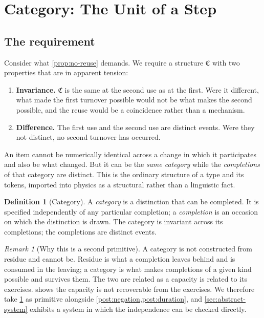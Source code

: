 \documentclass[11pt,twocolumn,a4paper]{article}
\theoremstyle{plain}
\theoremstyle{definition}
\newtheorem{definition}[theorem]{Definition}
\theoremstyle{remark}
\newtheorem{remark}[theorem]{Remark}
\newcommand{\Cat}{\mathfrak{C}}
\begin{document}
\section{Category: The Unit of a Step}
\label{sec:category}

\subsection{The requirement}

Consider what \cref{prop:no-reuse} demands. We require a structure $\Cat$ with
two properties that are in apparent tension:

\begin{enumerate}[label=(\roman*),leftmargin=2.5em]
\item \textbf{Invariance.} $\Cat$ is the same at the second use as at the first.
Were it different, what made the first turnover possible would not be what makes
the second possible, and the reuse would be a coincidence rather than a
mechanism.
\item \textbf{Difference.} The first use and the second use are distinct events.
Were they not distinct, no second turnover has occurred.
\end{enumerate}

An item cannot be numerically identical across a change in which it participates
and also be what changed. But it can be the \emph{same category} while the
\emph{completions} of that category are distinct. This is the ordinary structure
of a type and its tokens, imported into physics as a structural rather than a
linguistic fact.

\begin{definition}[Category]
\label{def:category}
A \emph{category} is a distinction that can be completed. It is specified
independently of any particular completion; a \emph{completion} is an occasion
on which the distinction is drawn. The category is invariant across its
completions; the completions are distinct events.
\end{definition}

\begin{remark}[Why this is a second primitive]
\label{rem:second-primitive}
A category is not constructed from residue and cannot be. Residue is what a
completion leaves behind and is consumed in the leaving; a category is what
makes completions of a given kind possible and survives them. The two are
related as a capacity is related to its exercises.  shows
the capacity is not recoverable from the exercises. We therefore take
\cref{def:category} as primitive alongside
\cref{post:negation,post:duration}, and \cref{sec:abstract-system} exhibits a
system in which the independence can be checked directly.
\end{remark}
\end{document}
